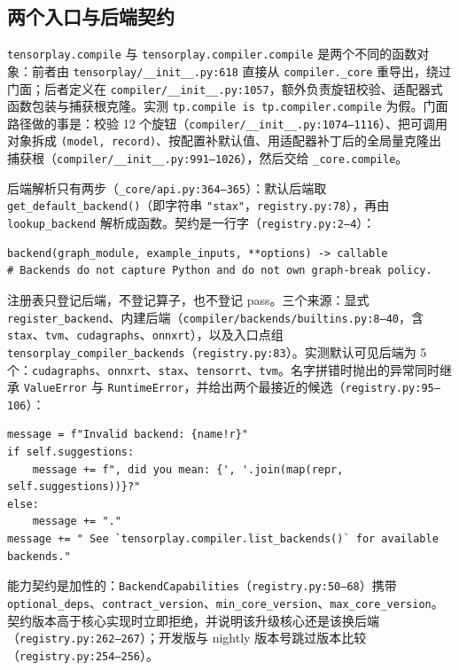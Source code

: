 \subsection{两个入口与后端契约}

\texttt{tensorplay.compile} 与 \texttt{tensorplay.compiler.compile} 是两个不同的函数对象：前者由 \texttt{tensorplay/\_\_init\_\_.py:618} 直接从 \texttt{compiler.\_core} 重导出，绕过门面；后者定义在 \texttt{compiler/\_\_init\_\_.py:1057}，额外负责旋钮校验、适配器式函数包装与捕获根克隆。实测 \texttt{tp.compile is tp.compiler.compile} 为假。门面路径做的事是：校验 12 个旋钮（\texttt{compiler/\_\_init\_\_.py:1074--1116}）、把可调用对象拆成 \texttt{(model, record)}、按配置补默认值、用适配器补丁后的全局量克隆出捕获根（\texttt{compiler/\_\_init\_\_.py:991--1026}），然后交给 \texttt{\_core.compile}。

后端解析只有两步（\texttt{\_core/api.py:364--365}）：默认后端取 \texttt{get\_default\_backend()}（即字符串 \texttt{"stax"}，\texttt{registry.py:78}），再由 \texttt{lookup\_backend} 解析成函数。契约是一行字（\texttt{registry.py:2--4}）：

\begin{lstlisting}[caption={后端契约。}, label=lst:fe:contract, style=pystyle]
backend(graph_module, example_inputs, **options) -> callable
# Backends do not capture Python and do not own graph-break policy.
\end{lstlisting}

注册表只登记后端，不登记算子，也不登记 pass。三个来源：显式 \texttt{register\_backend}、内建后端（\texttt{compiler/backends/builtins.py:8--40}，含 \texttt{stax}、\texttt{tvm}、\texttt{cudagraphs}、\texttt{onnxrt}），以及入口点组 \texttt{tensorplay\_compiler\_backends}（\texttt{registry.py:83}）。实测默认可见后端为 5 个：\texttt{cudagraphs}、\texttt{onnxrt}、\texttt{stax}、\texttt{tensorrt}、\texttt{tvm}。名字拼错时抛出的异常同时继承 \texttt{ValueError} 与 \texttt{RuntimeError}，并给出两个最接近的候选（\texttt{registry.py:95--106}）：

\begin{lstlisting}[caption={后端名错误的诊断（\texttt{registry.py:98--105}）。}, label=lst:fe:badbackend, style=pystyle]
message = f"Invalid backend: {name!r}"
if self.suggestions:
    message += f", did you mean: {', '.join(map(repr, self.suggestions))}?"
else:
    message += "."
message += " See `tensorplay.compiler.list_backends()` for available backends."
\end{lstlisting}

能力契约是加性的：\texttt{BackendCapabilities}（\texttt{registry.py:50--68}）携带 \texttt{optional\_deps}、\texttt{contract\_version}、\texttt{min\_core\_version}、\texttt{max\_core\_version}。契约版本高于核心实现时立即拒绝，并说明该升级核心还是该换后端（\texttt{registry.py:262--267}）；开发版与 nightly 版本号跳过版本比较（\texttt{registry.py:254--256}）。

